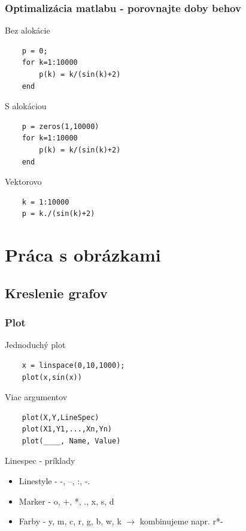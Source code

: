 \documentclass{beamer}
\begin{document}
\begin{frame}[fragile]
\frametitle{Optimalizácia matlabu - porovnajte doby behov}
  \begin{block}{Bez alokácie}
  \begin{verbatim}
    p = 0;
    for k=1:10000
        p(k) = k/(sin(k)+2)
    end \end{verbatim}
  \end{block}
  
  \begin{block}{S alokáciou}
  \begin{verbatim}
    p = zeros(1,10000)
    for k=1:10000
        p(k) = k/(sin(k)+2)
    end \end{verbatim}
  \end{block}
  
  \begin{block}{Vektorovo}
  \begin{verbatim}
    k = 1:10000
    p = k./(sin(k)+2) \end{verbatim}
  \end{block}
\end{frame}

\section{Práca s obrázkami}

\subsection{Kreslenie grafov}

\begin{frame}[fragile]
\frametitle{Plot}
  \begin{block}{Jednoduchý plot}
  \begin{verbatim}
    x = linspace(0,10,1000);
    plot(x,sin(x)) \end{verbatim}
  \end{block}
  
  \begin{block}{Viac argumentov}
  \begin{verbatim}
    plot(X,Y,LineSpec) 
    plot(X1,Y1,...,Xn,Yn)
    plot(____, Name, Value) \end{verbatim}
  \end{block}
  
   \begin{block}{Linespec - príklady}
   \begin{itemize}
    \item Linestyle - -, --, :, -.
    \item Marker - o, +, *, ., x, s, d
    \item Farby - y, m, c, r, g, b, w, k $\rightarrow$ kombinujeme napr. r*-
   \end{itemize}
  \end{block}
\end{frame}
\end{document}
